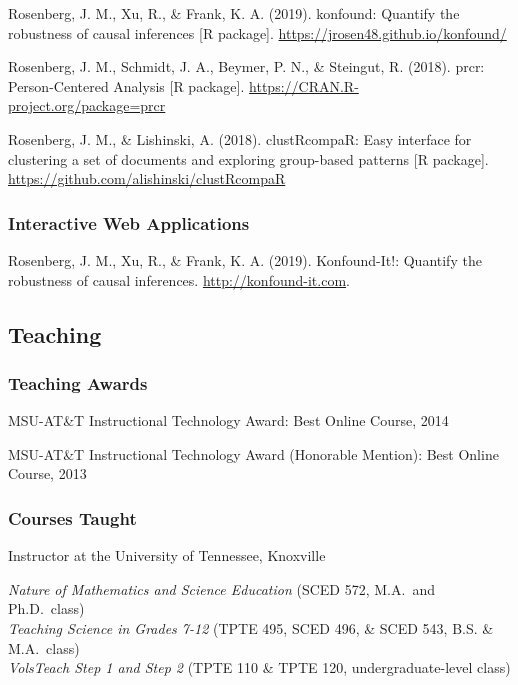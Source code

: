 \documentclass[14,]{article}
\begin{document}
Rosenberg, J. M., Xu, R., \& Frank, K. A. (2019). konfound: Quantify the
robustness of causal inferences {[}R package{]}.
\url{https://jrosen48.github.io/konfound/}

Rosenberg, J. M., Schmidt, J. A., Beymer, P. N., \& Steingut, R. (2018).
prcr: Person-Centered Analysis {[}R package{]}.
\url{https://CRAN.R-project.org/package=prcr}

Rosenberg, J. M., \& Lishinski, A. (2018). clustRcompaR: Easy interface
for clustering a set of documents and exploring group-based patterns
{[}R package{]}. \url{https://github.com/alishinski/clustRcompaR}

\hypertarget{interactive-web-applications}{%
\subsubsection{Interactive Web
Applications}\label{interactive-web-applications}}

Rosenberg, J. M., Xu, R., \& Frank, K. A. (2019). Konfound-It!: Quantify
the robustness of causal inferences. \url{http://konfound-it.com}.

\hypertarget{teaching}{%
\subsection{Teaching}\label{teaching}}

\hypertarget{teaching-awards}{%
\subsubsection{Teaching Awards}\label{teaching-awards}}

MSU-AT\&T Instructional Technology Award: Best Online Course, 2014

MSU-AT\&T Instructional Technology Award (Honorable Mention): Best
Online Course, 2013

\hypertarget{courses-taught}{%
\subsubsection{Courses Taught}\label{courses-taught}}

Instructor at the University of Tennessee, Knoxville

\emph{Nature of Mathematics and Science Education} (SCED 572, M.A.~and
Ph.D.~class)\\
\emph{Teaching Science in Grades 7-12} (TPTE 495, SCED 496, \& SCED 543,
B.S. \& M.A.~class)\\
\emph{VolsTeach Step 1 and Step 2} (TPTE 110 \& TPTE 120,
undergraduate-level class)
\end{document}
